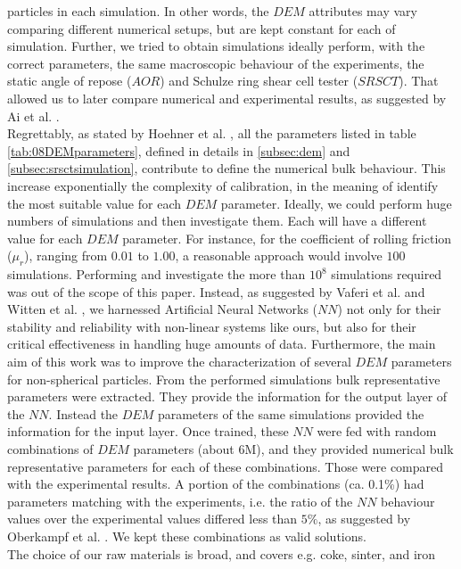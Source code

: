 particles in each simulation. 
In other words, the $DEM$ attributes may vary comparing different 
numerical setups, but are kept constant for each of simulation. 
Further, we tried to obtain simulations ideally perform, with the correct parameters, 
the same macroscopic behaviour of the experiments, the static angle of repose
($AOR$) and Schulze ring shear cell tester ($SRSCT$). That allowed us to later
compare numerical and experimental results, as suggested by Ai et al.
\cite{RefWorks:131}.\\
Regrettably, as stated by Hoehner et al. \cite{RefWorks:86}, all the parameters
listed in table \ref{tab:08DEMparameters}, defined in details in
\ref{subsec:dem} and \ref{subsec:srsctsimulation}, contribute to define the
numerical bulk behaviour.
This increase exponentially the complexity of calibration, in the meaning of 
identify the most suitable value for each $DEM$ parameter.
Ideally, we could perform huge numbers of simulations and then investigate them.
Each will have a different value for each $DEM$ parameter.
For instance, for the coefficient of rolling friction ($\mu_r$), ranging from
$0.01$ to $1.00$, a reasonable approach would involve $100$ simulations.
Performing and investigate the 
more than $10^8$ simulations required was out of the scope of this paper.
Instead, as suggested by Vaferi et al. \cite{RefWorks:150} and Witten et al.
\cite{RefWorks:174}, we harnessed Artificial Neural Networks ($NN$) not only for
their stability and reliability with non-linear systems like ours,
but also for their critical effectiveness in handling huge amounts of data.
Furthermore, the main aim of this work was to improve the characterization 
of several $DEM$ parameters for non-spherical particles. 
From the performed simulations bulk representative parameters were extracted. 
They provide the information for the output layer of the $NN$. Instead the $DEM$ 
parameters of the same simulations provided the information for the input layer. 
Once trained, these $NN$ were fed with random combinations of $DEM$ parameters
(about 6M), and they provided numerical bulk representative parameters for each
of these combinations.
Those were compared with the experimental results. A portion of the combinations
(ca. 0.1\%) had parameters matching with the experiments, i.e. the ratio of the $NN$ behaviour
values over the experimental values differed less than $5\%$, as suggested by
Oberkampf et al. \cite{RefWorks:160}.
We kept these combinations as valid solutions. \\
The choice of our raw materials is broad, and covers e.g. coke, sinter, and iron
